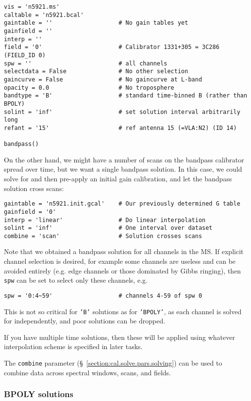 {\begin{verbatim}
vis = 'n5921.ms'
caltable = 'n5921.bcal'
gaintable = ''                   # No gain tables yet
gainfield = ''
interp = ''
field = '0'                      # Calibrator 1331+305 = 3C286 (FIELD_ID 0)
spw = ''                         # all channels
selectdata = False               # No other selection
gaincurve = False                # No gaincurve at L-band
opacity = 0.0                    # No troposphere
bandtype = 'B'                   # standard time-binned B (rather than BPOLY)
solint = 'inf'                   # set solution interval arbitrarily long
refant = '15'                    # ref antenna 15 (=VLA:N2) (ID 14)

bandpass()
\end{verbatim}
\normalsize

On the other hand, we might have a number of scans on the bandpass
calibrator spread over time, but we want a single bandpass solution.
In this case, we could solve for and then pre-apply an initial gain
calibration, and let the bandpass solution cross scans:
\small
\begin{verbatim}
gaintable = 'n5921.init.gcal'    # Our previously determined G table
gainfield = '0'
interp = 'linear'                # Do linear interpolation
solint = 'inf'                   # One interval over dataset
combine = 'scan'                 # Solution crosses scans
\end{verbatim}
\normalsize

Note that we obtained a bandpass solution for all channels in the MS.
If explicit channel selection is desired, for example some channels 
are useless and can be avoided entirely (e.g. edge channels or those
dominated by Gibbs ringing), then {\tt spw} can be set to select only
these channels, e.g.
\small
\begin{verbatim}
spw = '0:4~59'                   # channels 4-59 of spw 0
\end{verbatim}
\normalsize
This is not so critical for {\tt 'B'} solutions as for {\tt 'BPOLY'},
as each channel is solved for independently, and poor solutions
can be dropped.

If you have multiple time solutions, then these will be applied using
whatever interpolation scheme is specified in later tasks. 

The {\tt combine} parameter (\S~\ref{section:cal.solve.pars.solving}) 
can be used to combine data across spectral windows, scans, and fields.

\subsubsection{BPOLY solutions}
\label{section:cal.solve.band.bpoly}

}
